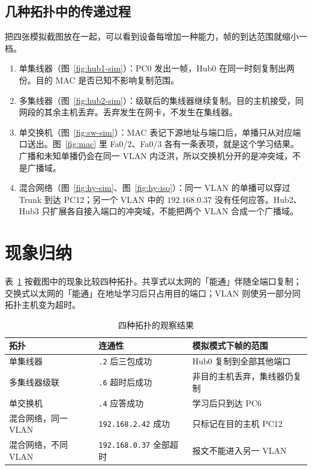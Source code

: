 \documentclass[10.5pt,a4paper,UTF8]{article}
\begin{document}
\subsection{几种拓扑中的传递过程}
把四张模拟截图放在一起，可以看到设备每增加一种能力，帧的到达范围就缩小一档。

\begin{enumerate}[leftmargin=2em]
    \item 单集线器（图~\ref{fig:hub1-sim}）：PC0 发出一帧，Hub0 在同一时刻复制出两份。目的 MAC 是否已知不影响复制范围。
    \item 多集线器（图~\ref{fig:hub2-sim}）：级联后的集线器继续复制。目的主机接受，同网段的其余主机丢弃。丢弃发生在网卡，不发生在集线器。
    \item 单交换机（图~\ref{fig:sw-sim}）：MAC 表记下源地址与端口后，单播只从对应端口送出。图~\ref{fig:mac} 里 Fa0/2、Fa0/3 各有一条表项，就是这个学习结果。广播和未知单播仍会在同一 VLAN 内泛洪，所以交换机分开的是冲突域，不是广播域。
    \item 混合网络（图~\ref{fig:hy-sim}、图~\ref{fig:hy-iso}）：同一 VLAN 的单播可以穿过 Trunk 到达 PC12；另一个 VLAN 中的 $192.168.0.37$ 没有任何应答。Hub2、Hub3 只扩展各自接入端口的冲突域，不能把两个 VLAN 合成一个广播域。
\end{enumerate}

\section{现象归纳}
表~\ref{tab:summary} 按截图中的现象比较四种拓扑。共享式以太网的「能通」伴随全端口复制；交换式以太网的「能通」在地址学习后只占用目的端口；VLAN 则使另一部分同拓扑主机变为超时。

\begin{table}[htbp]
\centering
\caption{四种拓扑的观察结果}
\label{tab:summary}
\begin{tabular}{lll}
\toprule
拓扑 & 连通性 & 模拟模式下帧的范围 \\
\midrule
单集线器 & \texttt{.2} 后三包成功 & Hub0 复制到全部其他端口 \\
多集线器级联 & \texttt{.6} 超时后成功 & 非目的主机丢弃，集线器仍复制 \\
单交换机 & \texttt{.4} 应答成功 & 学习后只到达 PC6 \\
混合网络，同一 VLAN & \texttt{192.168.2.42} 成功 & 只标记在目的主机 PC12 \\
混合网络，不同 VLAN & \texttt{192.168.0.37} 全部超时 & 报文不能进入另一 VLAN \\
\bottomrule
\end{tabular}
\end{table}
\end{document}
